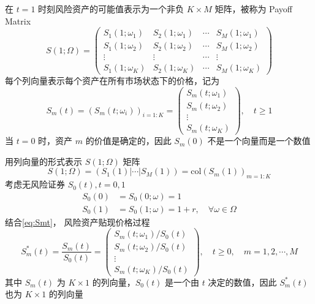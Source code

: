 在 $t=1$ 时刻风险资产的可能值表示为一个非负 $K\times M$ 矩阵，被称为 Payoff Matrix
\[
S(1;\Omega)=\begin{pmatrix}
    S_1(1;\omega_1) & S_2(1;\omega_1) & \cdots & S_M(1;\omega_1)\\
    S_1(1;\omega_2) & S_2(1;\omega_2) & \cdots & S_M(1;\omega_2)\\
    \vdots & \vdots & \cdots & \vdots\\
    S_1(1;\omega_K) & S_2(1;\omega_K) & \cdots & S_M(1;\omega_K)
\end{pmatrix}
\]
每个列向量表示每个资产在所有市场状态下的价格，记为
\begin{equation}
S_m(t)=(S_m(t;\omega_i))_{i=1:K}=\begin{pmatrix}
    S_m(t;\omega_1)\\
    S_m(t;\omega_2)\\
    \vdots\\
    S_m(t;\omega_K)
\end{pmatrix},\quad t\geq 1
\label{eq:Smt}
\end{equation}
当 $t=0$ 时，资产 $m$ 的价值是确定的，因此 $S_m(0)$ 不是一个向量而是一个数值

用列向量的形式表示 $S(1;\Omega)$ 矩阵
\begin{equation}
S(1;\Omega)=(S_1(1)|\cdots |S_M(1))=\text{col}(S_m(1))_{m=1:K}
\label{eq:vanilla_payoff}
\end{equation}
考虑无风险证券 $S_0(t),t=0,1$
\[
\begin{aligned}
    S_0(0)&=S_0(0;\omega)=1\\
    S_0(1)&=S_0(1;\omega)=1+r, \quad \forall \omega\in \Omega
\end{aligned}
\]
结合\eqref{eq:Smt}， 风险资产贴现价格过程
\begin{equation}
S_m^*(t)=\frac{S_m(t)}{S_0(t)}=\begin{pmatrix}
    S_m(t;\omega_1)/S_0(t)\\
    S_m(t;\omega_2)/S_0(t)\\
    \vdots\\
    S_m(t;\omega_K)/S_0(t)
\end{pmatrix},\quad t\geq 0,\quad m=1,2,\cdots,M
\label{eq:discount_vector}
\end{equation}
其中 $S_m(t)$ 为 $K\times 1$ 的列向量，$S_0(t)$ 是一个由 $t$ 决定的数值，因此 $S_m^*(t)$ 也为 $K\times 1$ 的列向量

